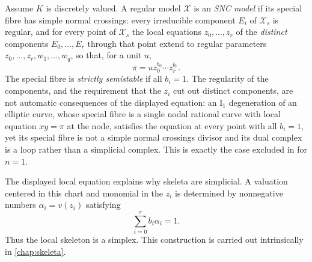 \begin{definition}\label{def:snc-model}
Assume $K$ is discretely valued. A regular model $\mathcal X$ is an
\emph{SNC model} if its special fibre has simple normal crossings: every
irreducible component $E_i$ of $\mathcal X_s$ is regular, and for every
point of $\mathcal X_s$ the local equations $z_0,\ldots,z_r$ of the
\emph{distinct} components $E_0,\ldots,E_r$ through that point extend to
regular parameters $z_0,\ldots,z_r,w_1,\ldots,w_q$, so that, for a unit
$u$,
\[
                         \pi=u z_0^{b_0}\cdots z_r^{b_r}.
\]
The special fibre is \emph{strictly semistable} if all $b_i=1$.  The
regularity of the components, and the requirement that the $z_i$ cut out
distinct components, are not automatic consequences of the displayed
equation: an $\mathrm I_1$ degeneration of an elliptic curve, whose special
fibre is a single nodal rational curve with local equation $xy=\pi$ at the
node, satisfies the equation at every point with all $b_i=1$, yet its
special fibre is not a simple normal crossings divisor and its dual complex
is a loop rather than a simplicial complex.  This is exactly the case
excluded in  for $n=1$.
\end{definition}

The displayed local equation explains why skeleta are simplicial. A valuation
centered in this chart and monomial in the $z_i$ is determined by nonnegative
numbers $\alpha_i=v(z_i)$ satisfying
\[
                         \sum_{i=0}^r b_i\alpha_i=1.
\]
Thus the local skeleton is a simplex. This construction is carried out
intrinsically in \cref{chap:skeleta}.

